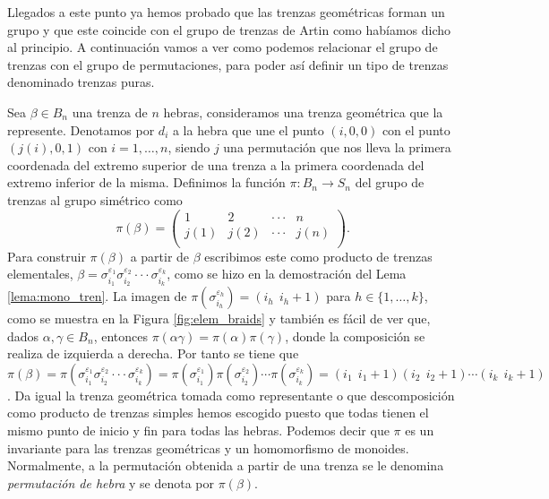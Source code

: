 \documentclass[12pt]{book}
\theoremstyle{definition}
\begin{document}
Llegados a este punto ya hemos probado que las trenzas geométricas forman un grupo y que este coincide con el grupo de trenzas de Artin como habíamos dicho al principio. A continuación vamos a ver como podemos relacionar el grupo de trenzas con el grupo de permutaciones, para poder así definir un tipo de trenzas denominado trenzas puras.

Sea $\beta\in B_n$ una trenza de $n$ hebras, consideramos una trenza geométrica que la represente. Denotamos por $d_i$ a la hebra que une el punto $(i,0,0)$ con el punto $(j(i),0,1)$ con $i = 1,\ldots,n$, siendo $j$ una permutación que nos lleva la primera coordenada del extremo superior de una trenza a la primera coordenada del extremo inferior de la misma. Definimos la función $\pi:B_n\rightarrow S_n$ del grupo de trenzas al grupo simétrico como
$$\pi(\beta) = \begin{pmatrix}
1 & 2 & \cdot\cdot\cdot & n\\
j(1) & j(2) & \cdot\cdot\cdot & j(n)\\
\end{pmatrix}. $$
Para construir $\pi(\beta)$ a partir de $\beta$ escribimos este como producto de trenzas elementales, $\beta = \sigma_{i_1}^{\varepsilon_1}\sigma_{i_2}^{\varepsilon_2}\cdot\cdot\cdot\sigma_{i_k}^{\varepsilon_k}$, como se hizo en la demostración del Lema \ref{lema:mono_tren}. La imagen de $\pi(\sigma_{i_h}^{\varepsilon_h})=(i_h\ \ i_h+1)$ para $h\in\{1,\ldots,k\}$, como se muestra en la Figura \ref{fig:elem_braids} y también es fácil de ver que, dados $\alpha,\gamma\in B_n$, entonces $\pi(\alpha\gamma)=\pi(\alpha)\pi(\gamma)$, donde la composición se realiza de izquierda a derecha. Por tanto se tiene que $\pi(\beta)=\pi(\sigma_{i_1}^{\varepsilon_1}\sigma_{i_2}^{\varepsilon_2}\cdot\cdot\cdot\sigma_{i_k}^{\varepsilon_k})=\pi(\sigma_{i_1}^{\varepsilon_1})\pi(\sigma_{i_2}^{\varepsilon_2})\cdots \pi(\sigma_{i_k}^{\varepsilon_k})=(i_1\ \ i_1+1)(i_2\ \ i_2+1)\cdots (i_k\ \ i_k+1)$.
Da igual la trenza geométrica tomada como representante o que descomposición como producto de trenzas simples hemos escogido puesto que todas tienen el mismo punto de inicio y fin para todas las hebras. Podemos decir que $\pi$ es un invariante para las trenzas geométricas y un homomorfismo de monoides. Normalmente, a la permutación obtenida a partir de una trenza se le denomina \textit{permutación de hebra} y se denota por $\pi(\beta)$.
\end{document}
